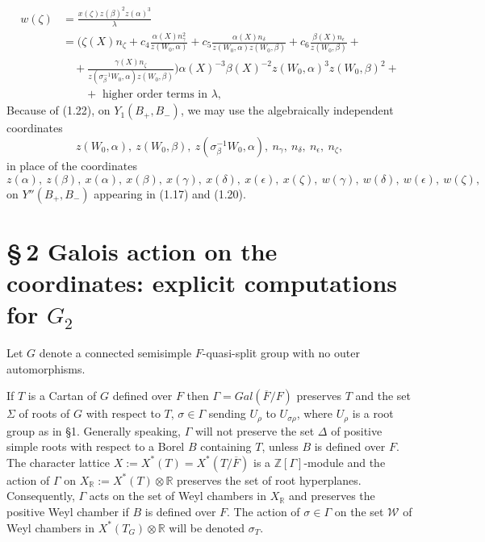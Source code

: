 \documentclass[12pt,letterpaper]{amsart}
\newcommand{\zzz}{\mathbb{Z}}
\newcommand{\rrr}{\mathbb{R}}
\begin{document}
\[
\begin{split}
w(\zeta)
&=\frac{x(\zeta)z(\beta)^2z(\alpha)^3}{\lambda}\\
&=(\zeta(X)n_\zeta + c_4\frac{\alpha(X)n_\gamma^2}{{z(W_0,\alpha)}}
+c_5\frac{\alpha(X)n_\delta}{{z(W_0,\alpha)z(W_0,\beta)}}
+c_6\frac{\beta(X)n_\epsilon}{{z(W_0,\beta)}}+\\
&\quad +\frac{\gamma(X)n_\zeta}{{z(\sigma_\beta^{-1}W_0,\alpha)z(W_0,\beta)}})
\alpha(X)^{-3}\beta(X)^{-2}z(W_0,\alpha)^3z(W_0,\beta)^2+\\
&\quad\quad +\text{ higher order terms in }\lambda,
\end{split}
\]
Because of (1.22), on $Y_1(B_+,B_-)$, we may
use the algebraically independent coordinates
\[
z(W_0,\alpha),\ z(W_0,\beta),\ z(\sigma_\beta^{-1}W_0,\alpha),\
n_\gamma,\ n_\delta,\ n_\epsilon,\ n_\zeta,
\]
in place of the coordinates
\[
z(\alpha),\ z(\beta),\ x(\alpha),\ x(\beta),\ x(\gamma),\
x(\delta),\ x(\epsilon),\ x(\zeta),\
w(\gamma),\ w(\delta),\ w(\epsilon),\ w(\zeta),
\]
on $Y''(B_+,B_-)$ appearing in (1.17) and (1.20).
\section*{\S\,2 Galois action on the coordinates:
explicit computations for $G_2$}

Let $G$ denote a connected semisimple $F$-quasi-split
group with no outer automorphisms.

If $T$ is a Cartan of $G$ defined over $F$ then
$\Gamma=Gal(\overline{F}/F)$ preserves
$T$ and the set $\Sigma$ of roots of $G$ with respect to $T$,
$\sigma\in \Gamma$ sending $U_\rho$ to $U_{\sigma\rho}$, where
$U_\rho$ is a root group as in \S1. Generally
speaking, $\Gamma$ will not preserve the set $\Delta$ of positive
simple roots with respect to a Borel $B$ containing $T$, unless
$B$ is defined over $F$. The character lattice
$X:=X^*(T)=X^*(T/\overline{F})$ is a $\zzz[\Gamma]$-module and the action
of $\Gamma$ on $X_{\rrr}:=X^*(T)\otimes \rrr$ preserves the
set of root hyperplanes. Consequently, $\Gamma$ acts on the
set of Weyl chambers in $X_{\rrr}$ and preserves the positive
Weyl chamber if $B$ is defined over $F$.
The action of $\sigma\in\Gamma$ on the set
${\mathcal W}$ of Weyl chambers in $X^*(T_G)\otimes \rrr$
will be denoted $\sigma_T$.
\end{document}
